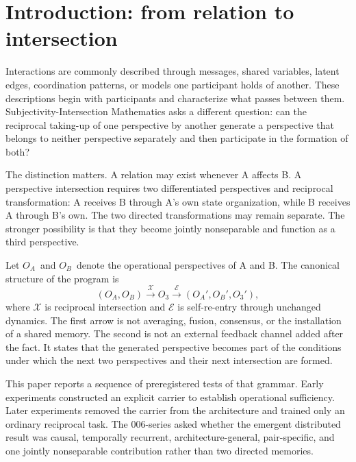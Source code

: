 \documentclass[11pt,a4paper]{article}
\newcommand{\OA}{\ensuremath{O_{A}}}
\newcommand{\OB}{\ensuremath{O_{B}}}
\newcommand{\Othree}{\ensuremath{O_{3}}}
\begin{document}
\vspace{1.2em}
{\small
\setlength{\parskip}{0pt}
\tableofcontents
}
\clearpage

\section{Introduction: from relation to intersection}

Interactions are commonly described through messages, shared variables, latent edges, coordination patterns, or models one participant holds of another. These descriptions begin with participants and characterize what passes between them. Subjectivity-Intersection Mathematics asks a different question: can the reciprocal taking-up of one perspective by another generate a perspective that belongs to neither perspective separately and then participate in the formation of both?

The distinction matters. A relation may exist whenever A affects B. A perspective intersection requires two differentiated perspectives and reciprocal transformation: A receives B through A's own state organization, while B receives A through B's own. The two directed transformations may remain separate. The stronger possibility is that they become jointly nonseparable and function as a third perspective.

Let \OA\ and \OB\ denote the operational perspectives of A and B. The canonical structure of the program is
\begin{equation}
 (\OA,\OB)
 \xrightarrow{\mathcal X}
 \Othree
 \xrightarrow{\mathcal E}
 (\OA',\OB',\Othree'),
 \label{eq:canonical}
\end{equation}
where $\mathcal X$ is reciprocal intersection and $\mathcal E$ is self-re-entry through unchanged dynamics. The first arrow is not averaging, fusion, consensus, or the installation of a shared memory. The second is not an external feedback channel added after the fact. It states that the generated perspective becomes part of the conditions under which the next two perspectives and their next intersection are formed.

This paper reports a sequence of preregistered tests of that grammar. Early experiments constructed an explicit carrier to establish operational sufficiency. Later experiments removed the carrier from the architecture and trained only an ordinary reciprocal task. The 006-series asked whether the emergent distributed result was causal, temporally recurrent, architecture-general, pair-specific, and one jointly nonseparable contribution rather than two directed memories.
\end{document}
